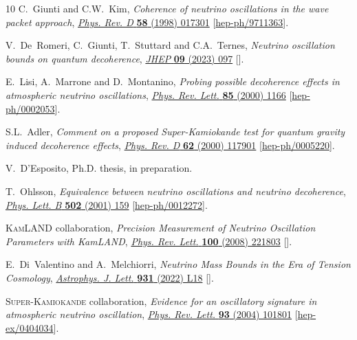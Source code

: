 \documentclass[11pt]{article}
\begin{document}
\begin{thebibliography}{10}
C.~Giunti and C.W.~Kim, \emph{{Coherence of neutrino oscillations in the wave
  packet approach}},
  \href{https://doi.org/10.1103/PhysRevD.58.017301}{\emph{Phys. Rev. D}
  {\bfseries 58} (1998) 017301}
  [\href{https://arxiv.org/abs/hep-ph/9711363}{{\ttfamily hep-ph/9711363}}].

V.~De~Romeri, C.~Giunti, T.~Stuttard and C.A.~Ternes, \emph{{Neutrino
  oscillation bounds on quantum decoherence}},
  \href{https://doi.org/10.1007/JHEP09(2023)097}{\emph{JHEP} {\bfseries 09}
  (2023) 097} [\href{https://arxiv.org/abs/2306.14699}{{}}].

E.~Lisi, A.~Marrone and D.~Montanino, \emph{{Probing possible decoherence
  effects in atmospheric neutrino oscillations}},
  \href{https://doi.org/10.1103/PhysRevLett.85.1166}{\emph{Phys. Rev. Lett.}
  {\bfseries 85} (2000) 1166}
  [\href{https://arxiv.org/abs/hep-ph/0002053}{{\ttfamily hep-ph/0002053}}].

S.L.~Adler, \emph{{Comment on a proposed Super-Kamiokande test for quantum
  gravity induced decoherence effects}},
  \href{https://doi.org/10.1103/PhysRevD.62.117901}{\emph{Phys. Rev. D}
  {\bfseries 62} (2000) 117901}
  [\href{https://arxiv.org/abs/hep-ph/0005220}{{\ttfamily hep-ph/0005220}}].

V.~D'Esposito, Ph.D. thesis, in preparation.

T.~Ohlsson, \emph{{Equivalence between neutrino oscillations and neutrino
  decoherence}},
  \href{https://doi.org/10.1016/S0370-2693(01)00178-2}{\emph{Phys. Lett. B}
  {\bfseries 502} (2001) 159}
  [\href{https://arxiv.org/abs/hep-ph/0012272}{{\ttfamily hep-ph/0012272}}].

{\scshape KamLAND} collaboration, \emph{{Precision Measurement of Neutrino
  Oscillation Parameters with KamLAND}},
  \href{https://doi.org/10.1103/PhysRevLett.100.221803}{\emph{Phys. Rev. Lett.}
  {\bfseries 100} (2008) 221803}
  [\href{https://arxiv.org/abs/0801.4589}{{}}].

E.~Di~Valentino and A.~Melchiorri, \emph{{Neutrino Mass Bounds in the Era of
  Tension Cosmology}},
  \href{https://doi.org/10.3847/2041-8213/ac6ef5}{\emph{Astrophys. J. Lett.}
  {\bfseries 931} (2022) L18}
  [\href{https://arxiv.org/abs/2112.02993}{{}}].

{\scshape Super-Kamiokande} collaboration, \emph{{Evidence for an oscillatory
  signature in atmospheric neutrino oscillation}},
  \href{https://doi.org/10.1103/PhysRevLett.93.101801}{\emph{Phys. Rev. Lett.}
  {\bfseries 93} (2004) 101801}
  [\href{https://arxiv.org/abs/hep-ex/0404034}{{\ttfamily hep-ex/0404034}}].


\end{thebibliography}
\end{document}
